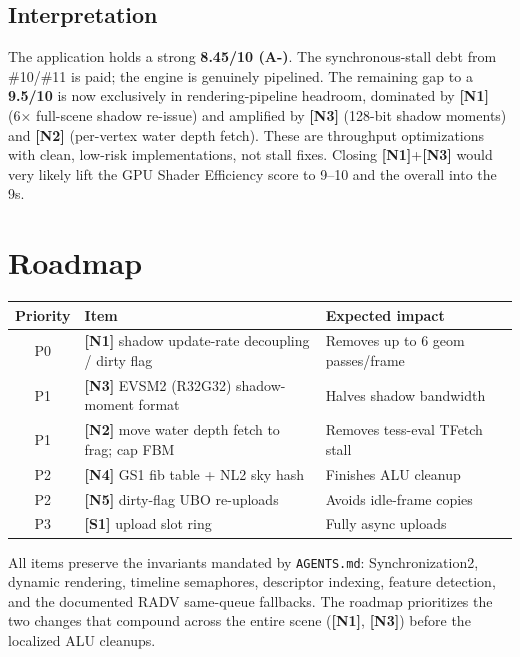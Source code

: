 \documentclass[a4paper,12pt]{article}
\newcommand{\scorebox}[2]{%
  \colorbox{#1}{\makebox[3.0cm][c]{\textcolor{white}{\textbf{#2}}}}%
}
\begin{document}
\scorebox{scorecolor}{OVERALL: 8.45 / 10}

\subsection*{Interpretation}

The application holds a strong \textbf{8.45/10 (A-)}. The synchronous-stall debt
from \#10/\#11 is paid; the engine is genuinely pipelined. The remaining gap to a
\textbf{9.5/10} is now exclusively in rendering-pipeline headroom, dominated by
\textbf{[N1]} (6× full-scene shadow re-issue) and amplified by \textbf{[N3]}
(128-bit shadow moments) and \textbf{[N2]} (per-vertex water depth fetch). These
are throughput optimizations with clean, low-risk implementations, not stall
fixes. Closing \textbf{[N1]}+\textbf{[N3]} would very likely lift the GPU Shader
Efficiency score to 9–10 and the overall into the 9s.

\newpage

\section{Roadmap}

\begin{center}
\begin{tabular}{cll}
\toprule
\textbf{Priority} & \textbf{Item} & \textbf{Expected impact} \\
\midrule
P0 & \textbf{[N1]} shadow update-rate decoupling / dirty flag & Removes up to 6 geom passes/frame \\
P1 & \textbf{[N3]} EVSM2 (R32G32) shadow-moment format        & Halves shadow bandwidth \\
P1 & \textbf{[N2]} move water depth fetch to frag; cap FBM    & Removes tess-eval TFetch stall \\
P2 & \textbf{[N4]} GS1 fib table + NL2 sky hash               & Finishes ALU cleanup \\
P2 & \textbf{[N5]} dirty-flag UBO re-uploads                  & Avoids idle-frame copies \\
P3 & \textbf{[S1]} upload slot ring                           & Fully async uploads \\
\bottomrule
\end{tabular}
\end{center}

\noindent All items preserve the invariants mandated by \texttt{AGENTS.md}:
Synchronization2, dynamic rendering, timeline semaphores, descriptor indexing,
feature detection, and the documented RADV same-queue fallbacks. The roadmap
prioritizes the two changes that compound across the entire scene (\textbf{[N1]},
\textbf{[N3]}) before the localized ALU cleanups.
\end{document}
